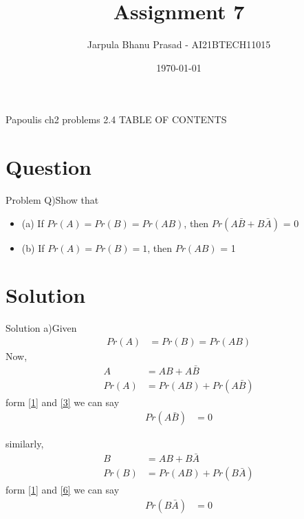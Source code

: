 \documentclass{beamer}
\title{Assignment 7}
\author{Jarpula Bhanu Prasad - AI21BTECH11015}
\date{\today}
\begin{document}
\begin{frame}
    \titlepage 
\end{frame}

\logo{}


\begin{frame}{Papoulis ch2 problems 2.4}
TABLE OF CONTENTS
    \tableofcontents
\end{frame}


\section{Question}
\begin{frame}{Problem}
Q)Show that 
\begin{itemize}
    \item  (a) If $Pr(A) = Pr(B) = Pr(AB)$, then $Pr(A\bar{B} + B\bar{A})$ = 0
    \item  (b) If $Pr(A) = Pr(B) = 1$, then $Pr(AB)$ = 1
\end{itemize}
\end{frame}

\section{Solution}
\begin{frame}{Solution}
    a)Given
    \begin{align} \label{1}
        Pr(A) & = Pr(B) = Pr(AB)
    \end{align}
    Now,
    \begin{align} \label{2} 
        A  & = AB + A\bar{B} \\ \label{3}
        Pr(A) & = Pr(AB) + Pr(A\bar{B})
    \end{align}
    form \eqref{1} and \eqref{3} we can say
    \begin{align} \label{4}
         Pr(A\bar{B}) & = 0
    \end{align}
\end{frame}

\begin{frame}
similarly,
    \begin{align} \label{5} 
        B & = AB + B\bar{A} \\ \label{6}
        Pr(B) & = Pr(AB) + Pr(B\bar{A})
    \end{align}
    form \eqref{1} and \eqref{6} we can say
    \begin{align} \label{7}
         Pr(B\bar{A}) & = 0
    \end{align}
\end{frame}
\end{document}
